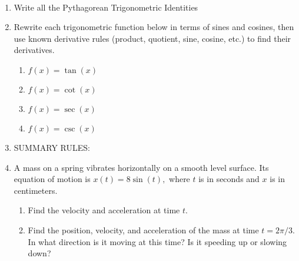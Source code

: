 \documentclass[11pt,fleqn]{article}
\begin{document}
\renewcommand{\headrulewidth}{0pt}
\newcommand{\blank}[1]{\rule{#1}{0.75pt}}
\newcommand{\bc}{\begin{center}}
\newcommand{\ec}{\end{center}}
\renewcommand{\d}{\displaystyle}

\vspace*{-0.7in}

\begin{center}
  \large
  \\
\end{center}
\begin{enumerate}

\item Write all the Pythagorean Trigonometric Identities\\
\vfill

\item Rewrite each trigonometric function below in terms of sines and cosines, then use known derivative rules (product, quotient, sine, cosine, etc.) to find their derivatives. \\
	\begin{enumerate}
	\item $f(x)=\tan(x)$
	\vfill
	\item $f(x)=\cot(x)$
	\vfill
	\item $f(x)=\sec(x)$
	\vfill
\newpage
	\item $f(x)=\csc(x)$
	\vspace{1in}
	\end{enumerate}
\item SUMMARY RULES:\\
\vspace{1.5in}
\item A mass on a spring vibrates horizontally on a smooth level surface. Its equation of motion is $x(t)=8 \sin(t),$  where $t$ is in seconds and $x$ is in centimeters.\\
	\begin{enumerate}
	\item Find the velocity and acceleration at time $t.$
	\vspace{1.5in}
	\item Find the position, velocity, and acceleration of the mass at time $t=2\pi / 3.$ In what direction is it moving at this time? Is it speeding up or slowing down?
	\vfill
	\end{enumerate}
\end{enumerate}
\end{document}
